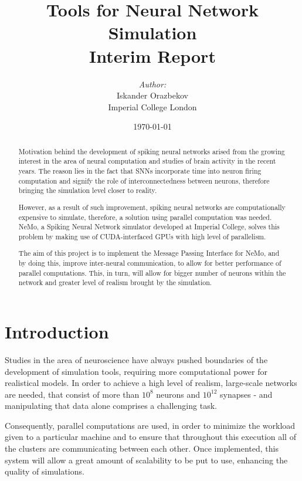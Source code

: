 \documentclass[12pt]{report}
\title{\LARGE Tools for Neural Network Simulation \\ \vspace{7mm} \large Interim Report}
\author{ \emph{Author:} \\ Iskander Orazbekov \vspace{56 mm} \\ Imperial College London}
\date{\today}
\begin{document}
\maketitle

\begin{abstract}

Motivation behind the development of spiking neural networks arised from the growing interest in the area of neural 
computation and studies of brain activity in the recent years. The reason lies in the fact that SNNs incorporate time
into neuron firing computation and signify the role of interconnectedness between neurons, therefore bringing the simulation 
level closer to reality.

However, as a result of such improvement, spiking neural networks are computationally expensive to simulate, therefore, a solution 
using parallel computation was needed. NeMo, a Spiking Neural Network simulator developed at Imperial College, solves this problem 
by making use of CUDA-interfaced GPUs with high level of parallelism.

The aim of this project is to implement the Message Passing Interface for NeMo, and by doing this, improve inter-neural communication, 
to allow for better performance of parallel computations. This, in turn, will allow for bigger number of neurons within the network 
and greater level of realism brought by the simulation.

\end{abstract}

\tableofcontents

\renewcommand{\chaptername}{}

\chapter{Introduction}

Studies in the area of neuroscience have always pushed boundaries of the development of simulation tools, requiring more computational power 
for realistical models. In order to achieve a high level of realism, large-scale networks are needed, that consist of more than \begin{math}10^8\end{math} neurons 
and \begin{math}10^{12}\end{math} synapses - and manipulating that data alone comprises a challenging task.

Consequently, parallel computations are used, in order to minimize the workload given to a particular machine and to ensure that throughout
this execution all of the clusters are communicating between each other. Once implemented, this system will allow a great amount of scalability
to be put to use, enhancing the quality of simulations.
\end{document}
